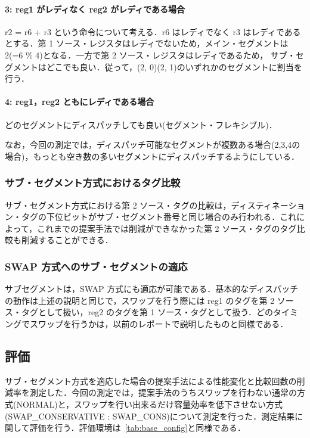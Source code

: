 \documentclass[twocolumn]{jsarticle}
\begin{document}
  \paragraph{3: reg1 がレディなく reg2 がレディである場合}
  r2 = r6 + r3 という命令について考える．r6 はレディでなく r3 はレディであるとする．第 1 ソース・レジスタはレディでないため，メイン・セグメントは2(=6 \% 4)となる．一方で第 2 ソース・レジスタはレディであるため， サブ・セグメントはどこでも良い．従って，(2, 0)(2, 1)のいずれかのセグメントに割当を行う．
  \paragraph{4: reg1，reg2 ともにレディである場合}
  どのセグメントにディスパッチしても良い(セグメント・フレキシブル)．

  なお，今回の測定では，ディスパッチ可能なセグメントが複数ある場合(2,3,4の場合)，もっとも空き数の多いセグメントにディスパッチするようにしている．

  \subsubsection{サブ・セグメント方式におけるタグ比較}
  サブ・セグメント方式における第 2 ソース・タグの比較は，ディスティネーション・タグの下位ビットがサブ・セグメント番号と同じ場合のみ行われる．これによって，これまでの提案手法では削減ができなかった第 2 ソース・タグのタグ比較も削減することができる．
  
  \subsubsection{SWAP 方式へのサブ・セグメントの適応}
  サブセグメントは，SWAP 方式にも適応が可能である．基本的なディスパッチの動作は上述の説明と同じで，スワップを行う際には reg1 のタグを第 2 ソース・タグとして扱い，reg2 のタグを第 1 ソース・タグとして扱う．どのタイミングでスワップを行うかは，以前のレポートで説明したものと同様である．

  \subsection{評価}
  サブ・セグメント方式を適応した場合の提案手法による性能変化と比較回数の削減率を測定した．今回の測定では，提案手法のうちスワップを行わない通常の方式(NORMAL)と，スワップを行い出来るだけ容量効率を低下させない方式(SWAP\_CONSERVATIVE : SWAP\_CONS)について測定を行った．測定結果に関して評価を行う．評価環境は~\ref{tab:base_config}と同様である．
\end{document}
